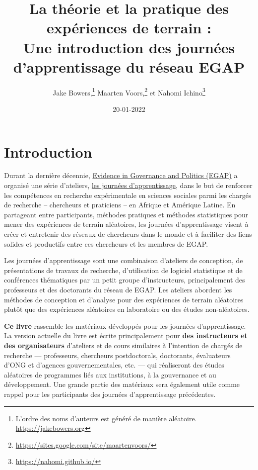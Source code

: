 \documentclass[
  12pt,
]{book}
\title{La théorie et la pratique des expériences de terrain :\\
Une introduction des journées d'apprentissage du réseau EGAP}
\author{Jake Bowers,\footnote{L'ordre des noms d'auteurs est généré de manière aléatoire. \url{https://jakebowers.org}} Maarten Voors,\footnote{\url{https://sites.google.com/site/maartenvoors/}} et Nahomi Ichino\footnote{\url{https://nahomi.github.io/}}}
\date{20-01-2022}
\begin{document}
\maketitle

\captionsetup[table]{list=no}
\captionsetup[figure]{list=no}

{
\hypersetup{linkcolor=}
\setcounter{tocdepth}{1}
\tableofcontents
}
\hypertarget{introduction}{%
\chapter{Introduction}\label{introduction}}

Durant la dernière décennie, \href{https://egap.org/}{Evidence in Governance and Politics (EGAP)} a organisé une série d'ateliers, \href{https://egap.org/learning-days/}{les journées d'apprentissage}, dans le but de renforcer les compétences en recherche expérimentale en sciences sociales parmi les chargés de recherche -- chercheurs et praticiens -- en Afrique et Amérique Latine. En partageant entre participants, méthodes pratiques et méthodes statistiques pour mener des expériences de terrain aléatoires, les journées d'apprentissage visent à créer et entretenir des réseaux de chercheurs dans le monde et à faciliter des liens solides et productifs entre ces chercheurs et les membres de EGAP.

Les journées d'apprentissage sont une combinaison d'ateliers de conception, de présentations de travaux de recherche, d'utilisation de logiciel statistique et de conférences thématiques par un petit groupe d'instructeurs, principalement des professeurs et des doctorants du réseau de EGAP. Les ateliers abordent les méthodes de conception et d'analyse pour des expériences de terrain aléatoires plutôt que des expériences aléatoires en laboratoire ou des études non-aléatoires.

\textbf{Ce livre} rassemble les matériaux développés pour les journées d'apprentissage. La version actuelle du livre est écrite principalement pour \textbf{des instructeurs et des organisateurs} d'ateliers et de cours similaires à l'intention de chargés de recherche --- professeurs, chercheurs postdoctorals, doctorants, évaluateurs d'ONG et d'agences gouvernementales, etc. --- qui réaliseront des études aléatoires de programmes liés aux institutions, à la gouvernance et au développement. Une grande partie des matériaux sera également utile comme rappel pour les participants des journées d'apprentissage précédentes.
\end{document}
